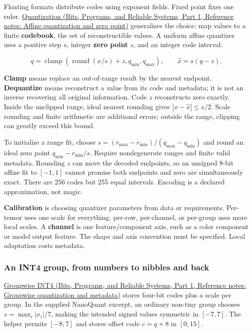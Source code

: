 Floating formats distribute codes using exponent fields. Fixed point fixes one ruler. \href{../01-Bits-Programs-and-Reliable-Systems-P01/main.pdf\#nameddest=appendix-d5da3eaabaef}{Quantization (Bits, Programs, and Reliable Systems, Part 1, Reference notes: Affine quantization and zero point)} generalizes the choice: map values to a finite \textbf{codebook}, the set of reconstructible values. A uniform affine quantizer uses a positive step \(s\), integer \textbf{zero point} \(z\), and an integer code interval:

\[
q=\operatorname{clamp}\!\left(\operatorname{round}(x/s)+z,q_{\min},q_{\max}\right),
\qquad
\widehat x=s(q-z).
\]

\textbf{Clamp} means replace an out-of-range result by the nearest endpoint. \textbf{Dequantize} means reconstruct a value from its code and metadata; it is not an inverse recovering all original information. Code \(z\) reconstructs zero exactly. Inside the unclipped range, ideal nearest rounding gives \(|x-\widehat x|\le s/2\). Scale rounding and finite arithmetic are additional errors; outside the range, clipping can greatly exceed this bound.

To initialize a range fit, choose \(s=(r_{\max}-r_{\min})/(q_{\max}-q_{\min})\) and round an ideal zero point \(q_{\min}-r_{\min}/s\). Require nondegenerate ranges and finite valid metadata. Rounding \(z\) can move the decoded endpoints, so an unsigned 8-bit affine fit to \([-1,1]\) cannot promise both endpoints and zero are simultaneously exact. There are 256 codes but 255 equal intervals. Encoding is a declared approximation, not magic.

\textbf{Calibration} is choosing quantizer parameters from data or requirements. Per-tensor uses one scale for everything; per-row, per-channel, or per-group uses more local scales. A \textbf{channel} is one feature/component axis, such as a color component or model output feature. The shape and axis convention must be specified. Local adaptation costs metadata.

\subsubsection{An INT4 group, from numbers to nibbles and back}\label{05-engine-i-ch001-an-int4-group-from-numbers-to-nibbles-and-back}

\hypertarget{05-engine-i-ch001-an-int4-group-from-numbers-to-nibbles-and-back}{}

\href{../01-Bits-Programs-and-Reliable-Systems-P01/main.pdf\#nameddest=appendix-638204c40e8b}{Groupwise INT4 (Bits, Programs, and Reliable Systems, Part 1, Reference notes: Groupwise quantization and metadata)} stores four-bit codes plus a scale per group. In the supplied NanoQuant excerpt, an ordinary non-tiny group chooses \(s=\max_i|x_i|/7\), making the intended signed values symmetric in \([-7,7]\). The helper permits \([-8,7]\) and stores offset code \(c=q+8\) in \([0,15]\).

